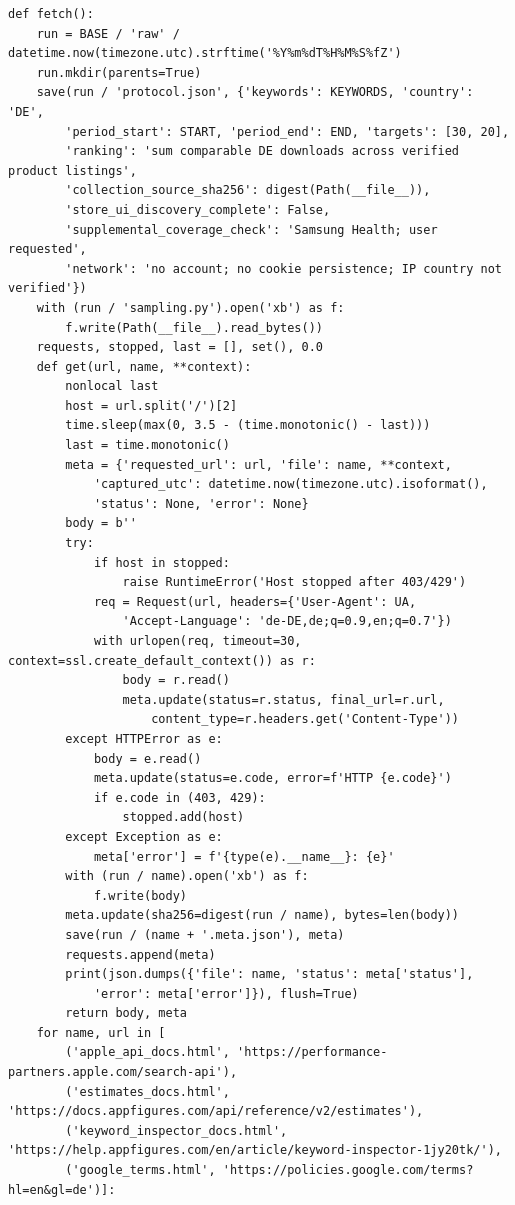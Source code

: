 \documentclass[10pt,a4paper]{article}
\begin{document}
\begin{lstlisting}
def fetch():
    run = BASE / 'raw' / datetime.now(timezone.utc).strftime('%Y%m%dT%H%M%S%fZ')
    run.mkdir(parents=True)
    save(run / 'protocol.json', {'keywords': KEYWORDS, 'country': 'DE',
        'period_start': START, 'period_end': END, 'targets': [30, 20],
        'ranking': 'sum comparable DE downloads across verified product listings',
        'collection_source_sha256': digest(Path(__file__)),
        'store_ui_discovery_complete': False,
        'supplemental_coverage_check': 'Samsung Health; user requested',
        'network': 'no account; no cookie persistence; IP country not verified'})
    with (run / 'sampling.py').open('xb') as f:
        f.write(Path(__file__).read_bytes())
    requests, stopped, last = [], set(), 0.0
    def get(url, name, **context):
        nonlocal last
        host = url.split('/')[2]
        time.sleep(max(0, 3.5 - (time.monotonic() - last)))
        last = time.monotonic()
        meta = {'requested_url': url, 'file': name, **context,
            'captured_utc': datetime.now(timezone.utc).isoformat(),
            'status': None, 'error': None}
        body = b''
        try:
            if host in stopped:
                raise RuntimeError('Host stopped after 403/429')
            req = Request(url, headers={'User-Agent': UA,
                'Accept-Language': 'de-DE,de;q=0.9,en;q=0.7'})
            with urlopen(req, timeout=30, context=ssl.create_default_context()) as r:
                body = r.read()
                meta.update(status=r.status, final_url=r.url,
                    content_type=r.headers.get('Content-Type'))
        except HTTPError as e:
            body = e.read()
            meta.update(status=e.code, error=f'HTTP {e.code}')
            if e.code in (403, 429):
                stopped.add(host)
        except Exception as e:
            meta['error'] = f'{type(e).__name__}: {e}'
        with (run / name).open('xb') as f:
            f.write(body)
        meta.update(sha256=digest(run / name), bytes=len(body))
        save(run / (name + '.meta.json'), meta)
        requests.append(meta)
        print(json.dumps({'file': name, 'status': meta['status'],
            'error': meta['error']}), flush=True)
        return body, meta
    for name, url in [
        ('apple_api_docs.html', 'https://performance-partners.apple.com/search-api'),
        ('estimates_docs.html', 'https://docs.appfigures.com/api/reference/v2/estimates'),
        ('keyword_inspector_docs.html', 'https://help.appfigures.com/en/article/keyword-inspector-1jy20tk/'),
        ('google_terms.html', 'https://policies.google.com/terms?hl=en&gl=de')]:

\end{lstlisting}
\end{document}
